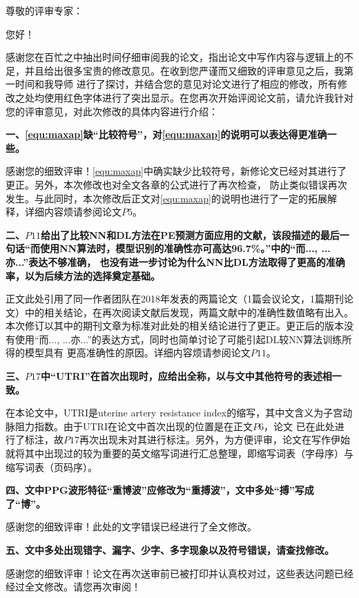 \cleardoublepage
{}
\noindent
尊敬的评审专家：

您好！

感谢您在百忙之中抽出时间仔细审阅我的论文，指出论文中写作内容与逻辑上的不足，并且给出很多宝贵的修改意见。在收到您严谨而又细致的评审意见之后，我第一时间和我导师
进行了探讨，并结合您的意见对论文进行了相应的修改，所有修改之处均使用红色字体进行了突出显示。在您再次开始评阅论文前，请允许我针对您的评审意见，对此次修改的具体内容进行介绍：

\textbf{一、\autoref{equ:maxap}缺“比较符号”，对\autoref{equ:maxap}的说明可以表达得更准确一些。}

感谢您的细致评审！\autoref{equ:maxap}中确实缺少比较符号，新修论文已经对其进行了更正。另外，本次修改也对全文各章的公式进行了再次检查，
防止类似错误再次发生。与此同时，本次修改后正文对\autoref{equ:maxap}的说明也进行了一定的拓展解释，详细内容烦请参阅论文$P5$。

\textbf{二、$P11$给出了比较NN和DL方法在PE预测方面应用的文献，该段描述的最后一句话“而使用NN算法时，模型识别的准确性亦可高达96.7\%。”中的“而..., ...亦...”表达不够准确，
也没有进一步讨论为什么NN比DL方法取得了更高的准确率，以为后续方法的选择奠定基础。}

正文此处引用了同一作者团队在2018年发表的两篇论文（1篇会议论文，1篇期刊论文）中的相关结论，在再次阅读文献后发现，两篇文献中的准确性数值略有出入。
本次修订以其中的期刊文章为标准对此处的相关结论进行了更正。更正后的版本没有使用“而..., ...亦...”的表达方式，同时也简单讨论了可能引起DL较NN算法训练所得的模型具有
更高准确性的原因。详细内容烦请参阅论文$P11$。

\textbf{三、$P17$中“UTRI”在首次出现时，应给出全称，以与文中其他符号的表述相一致。}

在本论文中，UTRI是uterine artery resistance index的缩写，其中文含义为子宫动脉阻力指数。由于UTRI在论文中首次出现的位置是在正文$P6$，论文
已在此处进行了标注，故$P17$再次出现未对其进行标注。另外，为方便评审，论文在写作伊始就将其中出现过的较为重要的英文缩写词进行汇总整理，即缩写词表（字母序）与
缩写词表（页码序）。

\textbf{四、文中PPG波形特征“重博波”应修改为“重搏波”，文中多处“搏”写成了“博”。}

感谢您的细致评审！此处的文字错误已经进行了全文修改。

\textbf{五、文中多处出现错字、漏字、少字、多字现象以及符号错误，请查找修改。}

感谢您的细致评审！论文在再次送审前已被打印并认真校对过，这些表达问题已经经过全文修改。请您再次审阅！

